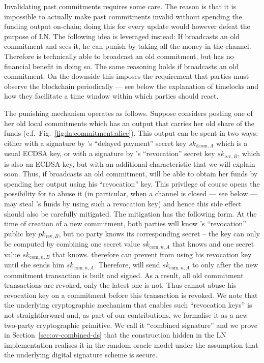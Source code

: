     Invalidating past commitments requires some care. The reason is that it is
    impossible to actually make past commitments invalid without spending the
    funding output on-chain; doing this for every update would however
    defeat the purpose of LN. The following idea is leveraged instead: If
    \alice{} broadcasts an old commitment and \bob{} sees it, he can punish
    \alice{} by taking all the money in the channel. Therefore \alice{} is
    technically able to broadcast an old commitment, but has no financial
    benefit in doing so. The same reasoning holds if \bob{} broadcasts
    an old commitment. On the downside this imposes the requirement that
    parties must observe the blockchain periodically --- see below the
    explanation of timelocks and how they facilitate a time window within which
    parties should react.

    The punishing mechanism operates as follows. Suppose \alice{} considers
    posting one of her old local commitments which has an output that carries her old
    share of the funds (c.f.\ Fig.~\ref{fig:ln:commitment:alice}). This output
    can be spent in two ways: either with a
    signature by \alice's ``delayed payment'' secret key
    $sk_{\mathrm{dcom}, A}$ which is a usual ECDSA key, or with a
    signature by \bob's ``revocation'' secret key $sk_{\mathrm{rev},
    B}$, which is also an ECDSA key, but with an additional characteristic that
    we will explain soon. Thus, if \alice{} broadcasts an old commitment, \bob{}
    will be able to obtain her funds by spending her output using his
    ``revocation'' key. This privilege of course opens the possibility for
    \bob{} to abuse it (in particular, when a channel is closed --- see below
    --- \bob{} may steal \alice's funds by using such a revocation key) and
    hence this side effect should also be carefully mitigated. The mitigation
    has the following form. At the time of creation of a new commitment, both
    parties will know \bob's ``revocation'' public key $pk_{\mathrm{rev}, B}$,
    but no party knows its corresponding secret -- the key can only be computed
    by combining one secret value $sk_{\mathrm{com}, n, A}$ that
    \alice{} knows and one secret value $sk_{\mathrm{com}, n, B}$ that
    \bob{} knows. \alice{} therefore can prevent \bob{} from using his
    revocation key until she sends him $sk_{\mathrm{com}, n, A}$.
    Therefore, \alice{} will send $sk_{\mathrm{com}, n, A}$ to \bob{} only
    after the new commitment transaction is built and signed. As a result, all
    old commitment transactions are revoked, only the latest one is not. Thus
    \bob{} cannot
    abuse his revocation key on a commitment before this transaction is revoked.
    We note that the underlying cryptographic mechanism  that enables such
    ``revocation keys'' is not straightforward and, as part of our
    contributions, we formalise it as a new two-party cryptographic primitive.
    We call it ``combined signature'' and we prove in
    Section~\ref{sec:ov-combined-ds} that the construction hidden
    in the LN implementation realises it in the random oracle model under the
    assumption that the underlying digital signature scheme is secure.

